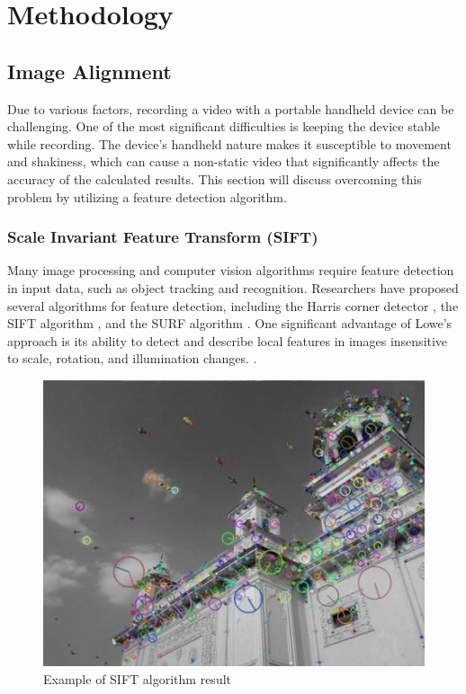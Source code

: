 \chapter{Methodology}

\section{Image Alignment}

Due to various factors, recording a video with a portable handheld device can be challenging. One of the most significant difficulties is keeping the device stable while recording. The device's handheld nature makes it susceptible to movement and shakiness, which can cause a non-static video that significantly affects the accuracy of the calculated results. This section will discuss overcoming this problem by utilizing a feature detection algorithm.


\subsection{Scale Invariant Feature Transform (SIFT)}
\label{sec:sift}

Many image processing and computer vision algorithms require feature detection in input data, such as object tracking and recognition. Researchers have proposed several algorithms for feature detection, including the Harris corner detector \cite{harris1988}, the SIFT algorithm \cite{lowe2004}, and the SURF algorithm \cite{bay2006}. One significant advantage of Lowe's approach is its ability to detect and describe local features in images insensitive to scale, rotation, and illumination changes. \cite{lowe2004}.

\begin{figure}[t]
	\centering
		\includegraphics[scale=0.75]{texs/chapter2/image/sift1.png}
		\caption{Example of SIFT algorithm result \cite{cvSift}}
		\label{siftexample}
\end{figure}

